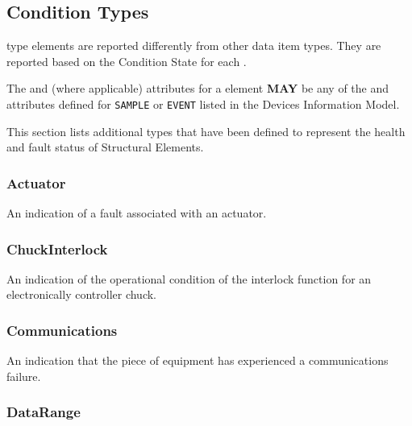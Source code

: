 \subsection{Condition Types} \label{sec:Condition Types}


 type elements are reported differently from other data item types. They are reported based on the \gls{Condition State} for each .

The  and  (where applicable) attributes for a  element \textbf{MAY} be any of the  and  attributes defined for \texttt{SAMPLE}  or \texttt{EVENT}   listed in the \gls{Devices Information Model}.

This section lists additional  types that have been defined to represent the health and fault status of \glspl{Structural Element}.


\subsubsection{Actuator}




An indication of a fault associated with an actuator.


\subsubsection{ChuckInterlock}
\label{sec:ChuckInterlock}



An indication of the operational condition of the interlock function for an electronically controller chuck.


\subsubsection{Communications}
\label{sec:Communications}



An indication that the piece of equipment has experienced a communications failure.


\subsubsection{DataRange}
\label{sec:DataRange}



